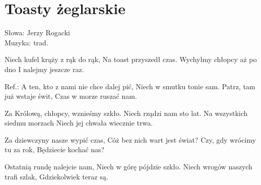 \section{Toasty żeglarskie}

Słowa: Jerzy Rogacki \\
Muzyka:  trad.

Niech kufel krąży z rąk do rąk,
Na toast przyszedł czas.
Wychylmy chłopcy aż po dno
I nalejmy jeszcze raz.

Ref.: A ten, kto z nami nie chce dalej pić,
Niech w smutku tonie sam.
Patrz, tam już wstaje świt,
Czas w morze ruszać nam.

Za Królową, chłopcy, wznieśmy szkło.
Niech rządzi nam sto lat.
Na wszystkich siedmu morzach
Niech jej chwała wiecznie trwa.

Za dziewczyny nasze wypić czas,
Cóż bez nich wart jest świat?
Czy, gdy wrócimy tu za rok,
Będziecie kochać nas?

Ostatnią rundę nalejcie nam,
Niech w górę pójdzie szkło.
Niech wrogów naszych trafi szlak,
Gdziekolwiek teraz są.